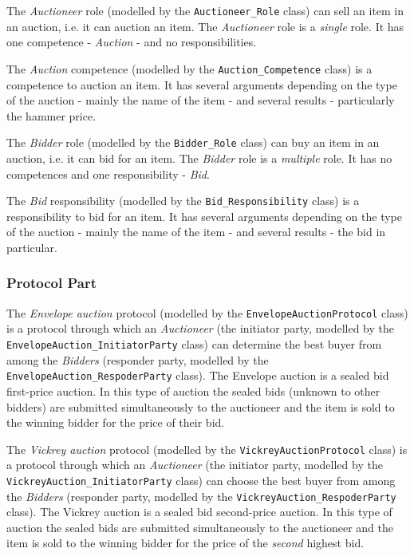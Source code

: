 The \textit{Auctioneer} role (modelled by the \texttt{Auctioneer\_Role} class) can sell an item in an auction, i.e. it can auction an item.
The \textit{Auctioneer} role is a \textit{single} role.
It has one competence - \textit{Auction} - and no responsibilities.

The \textit{Auction} competence (modelled by the \texttt{Auction\_Competence} class) is a competence to auction an item.
It has several arguments depending on the type of the auction - mainly the name of the item - and several results - particularly the hammer price.

The \textit{Bidder} role (modelled by the \texttt{Bidder\_Role} class) can buy an item in an auction, i.e. it can bid for an item. 
The \textit{Bidder} role is a \textit{multiple} role.
It has no competences and one responsibility - \textit{Bid}.

The \textit{Bid} responsibility (modelled by the \texttt{Bid\_Responsibility} class) is a responsibility to bid for an item.
It has several arguments depending on the type of the auction - mainly the name of the item - and several results - the bid in particular.

\subsubsection*{Protocol Part}

The \textit{Envelope auction} protocol (modelled by the \texttt{EnvelopeAuctionProtocol} class) is a protocol through which an \textit{Auctioneer} (the initiator party, modelled by the \texttt{EnvelopeAuction_InitiatorParty} class) can determine the best buyer from among the \textit{Bidders} (responder party, modelled by the \texttt{EnvelopeAuction_RespoderParty} class).
The Envelope auction is a sealed bid first-price auction.
In this type of auction the sealed bids (unknown to other bidders) are submitted simultaneously to the auctioneer and the item is sold to the winning bidder for the price of their bid.

The \textit{Vickrey auction} protocol (modelled by the \texttt{VickreyAuctionProtocol} class) is a protocol through which an \textit{Auctioneer} (the initiator party, modelled by the \texttt{VickreyAuction_InitiatorParty} class) can choose the best buyer from among the \textit{Bidders} (responder party, modelled by the \texttt{VickreyAuction_RespoderParty} class).
The Vickrey auction is a sealed bid second-price auction.
In this type of auction the sealed bids are submitted simultaneously to the auctioneer and the item is sold to the winning bidder for the price of the \textit{second} highest bid.

